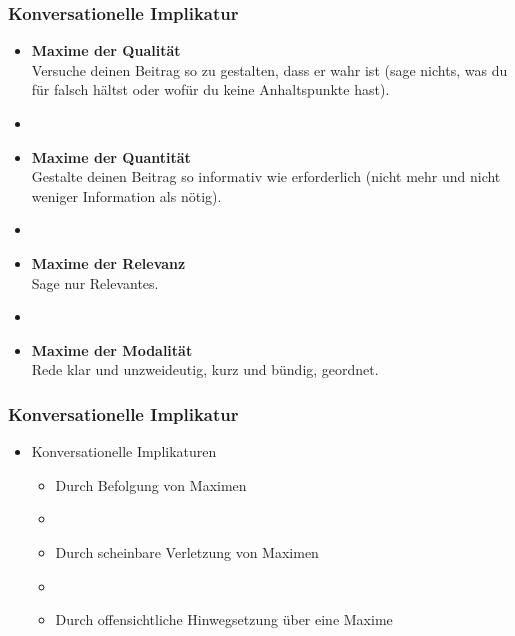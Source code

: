 
\begin{frame}
\frametitle{Konversationelle Implikatur}

\begin{itemize}
	\item \textbf{Maxime der Qualität}\\
Versuche deinen Beitrag so zu gestalten, dass er wahr ist (sage nichts, was du für falsch hältst oder wofür du keine Anhaltspunkte hast).
	\item[]
	\item \textbf{Maxime der Quantität}\\
Gestalte deinen Beitrag so informativ wie erforderlich (nicht mehr und nicht weniger Information als nötig).
	\item[]
	\item \textbf{Maxime der Relevanz}\\
Sage nur Relevantes.
	\item[]
	\item \textbf{Maxime der Modalität}\\
Rede klar und unzweideutig, kurz und bündig, geordnet.
\end{itemize}

\end{frame}



\begin{frame}
\frametitle{Konversationelle Implikatur}

\begin{itemize}
	\item Konversationelle Implikaturen
	
\vspace{5mm}
	
	\begin{itemize}
		\item Durch Befolgung von Maximen
		\item[]
		\item Durch scheinbare Verletzung von Maximen
		\item[]
		\item Durch offensichtliche Hinwegsetzung über eine Maxime
	\end{itemize}
	
\end{itemize}

\end{frame}



